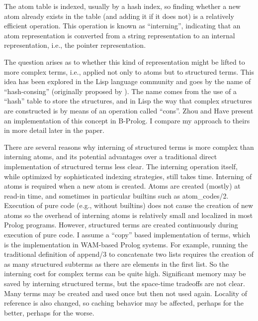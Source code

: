 \documentclass{llncs}
\begin{document}
The atom table is indexed, usually by a hash index, so finding whether
a new atom already exists in the table (and adding it if it does not)
is a relatively efficient operation.  This operation is known as
``interning'', indicating that an atom representation is converted
from a string representation to an internal representation, i.e., the
pointer representation.

The question arises as to whether this kind of representation might be
lifted to more complex terms, i.e., applied not only to atoms but to
structured terms.  This idea has been explored in the Lisp language
community \cite{goto74} and goes by the name of ``hash-consing''
(originally proposed by \cite{ershov}).  The name comes from the use
of a ``hash'' table to store the structures, and in Lisp the way that
complex structures are constructed is by means of an operation called
``cons''.  Zhou and Have
\cite{zhou-hash-consing} present an implementation of this concept
in B-Prolog.  I compare my approach to theirs in more detail later
in the paper.

There are several reasons why interning of structured terms is more
complex than interning atoms, and its potential advantages over a
traditional direct implementation of structured terms less clear.  The
interning operation itself, while optimized by sophisticated indexing
strategies, still takes time.  Interning of atoms is required when a
new atom is created.  Atoms are created (mostly) at read-in time, and
sometimes in particular builtins such as atom\_codes/2.  Execution of
pure code (e.g., without builtins) does not cause the creation of new
atoms so the overhead of interning atoms is relatively small and
localized in most Prolog programs.  However, structured terms are
created continuously during execution of pure code.  I assume a
``copy'' based implementation of terms, which is the implementation in
WAM-based Prolog systems.  For example, running the traditional
definition of append/3 to concatenate two lists requires the creation
of as many structured subterms as there are elements in the first
list.  So the interning cost for complex terms can be quite high.
Significant memory may be saved by interning structured terms, but the
space-time tradeoffs are not clear.  Many terms may be created and
used once but then not used again.  Locality of reference is also
changed, so caching behavior may be affected, perhaps for the better,
perhaps for the worse.
\end{document}
